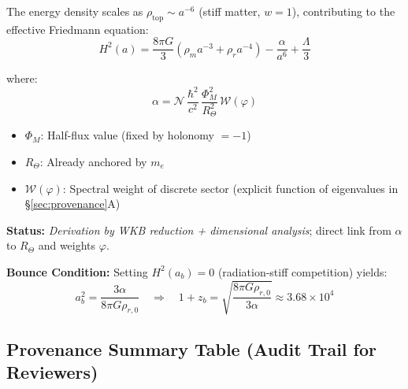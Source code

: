 \documentclass[12pt]{article}
\begin{document}
The energy density scales as $\rho_{\text{top}} \sim a^{-6}$ (stiff matter, $w = 1$), contributing to the effective Friedmann equation:
\begin{equation}
H^2(a) = \frac{8\pi G}{3} \left(\rho_m a^{-3} + \rho_r a^{-4}\right) - \frac{\alpha}{a^6} + \frac{\Lambda}{3}
\end{equation}

where:
\begin{equation}
\alpha = \mathcal{N} \, \frac{\hbar^2}{c^2} \, \frac{\Phi_M^2}{R_\Theta^2} \, \mathcal{W}(\varphi)
\end{equation}

\begin{itemize}
\item $\Phi_M$: Half-flux value (fixed by holonomy $= -1$)
\item $R_\Theta$: Already anchored by $m_e$
\item $\mathcal{W}(\varphi)$: Spectral weight of discrete sector (explicit function of eigenvalues in \S\ref{sec:provenance}A)
\end{itemize}

\textbf{Status:} \textit{Derivation by WKB reduction + dimensional analysis}; direct link from $\alpha$ to $R_\Theta$ and weights $\varphi$.

\textbf{Bounce Condition:} Setting $H^2(a_b) = 0$ (radiation-stiff competition) yields:
\begin{equation}
a_b^2 = \frac{3\alpha}{8\pi G \rho_{r,0}} \quad \Rightarrow \quad 1+z_b = \sqrt{\frac{8\pi G \rho_{r,0}}{3\alpha}} \approx 3.68 \times 10^4
\end{equation}

\subsection{Provenance Summary Table (Audit Trail for Reviewers)}
\end{document}
